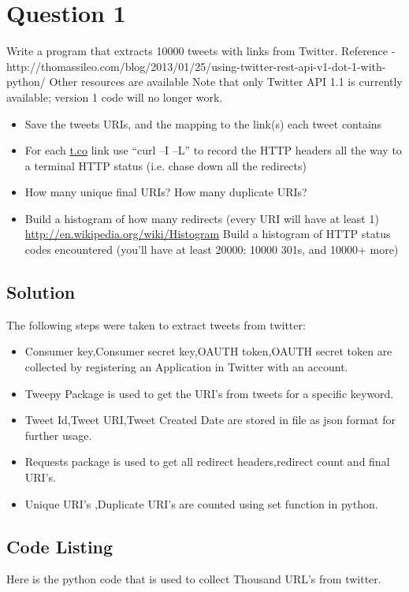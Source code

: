 


\section{Question 1}
\label{part1}

Write a program that extracts 10000 tweets with links from Twitter. 
	Reference - http://thomassileo.com/blog/2013/01/25/using-twitter-rest-api-v1-dot-1-with-python/ 
	Other resources are available 
	Note that only Twitter API 1.1 is currently available; version 1 code will no longer work. 
	
\begin{itemize}
\item Save the tweets URIs, and the mapping to the link(s) each tweet contains 
\item For each \url{t.co} link use ``curl –I –L'' to record the HTTP headers all the way to a terminal HTTP status (i.e. chase down all the redirects)
\item How many unique final URIs? How many duplicate URIs?
\item Build a histogram of how many redirects (every URI will have at least 1) \url {http://en.wikipedia.org/wiki/Histogram}
Build a histogram of HTTP status codes encountered (you’ll have at least 20000: 10000 301s, and 10000+ more)
\end{itemize}
\subsection{Solution}

The following steps were taken to extract tweets from twitter:
\begin{itemize}
	\item Consumer key,Consumer secret key,OAUTH token,OAUTH secret token are collected by registering an Application 
	in Twitter with an account.
	\item Tweepy Package is used to get the URI's from tweets for a specific keyword.
	\item Tweet Id,Tweet URI,Tweet Created Date are stored in file as json format for further usage.
	\item Requests package is used to get all redirect headers,redirect count and final URI's.
	\item Unique URI's ,Duplicate URI's are counted using set function in python.
\end{itemize}
\newpage
\subsection{Code Listing}
Here is the python code that is used to collect Thousand URL's from twitter. 


